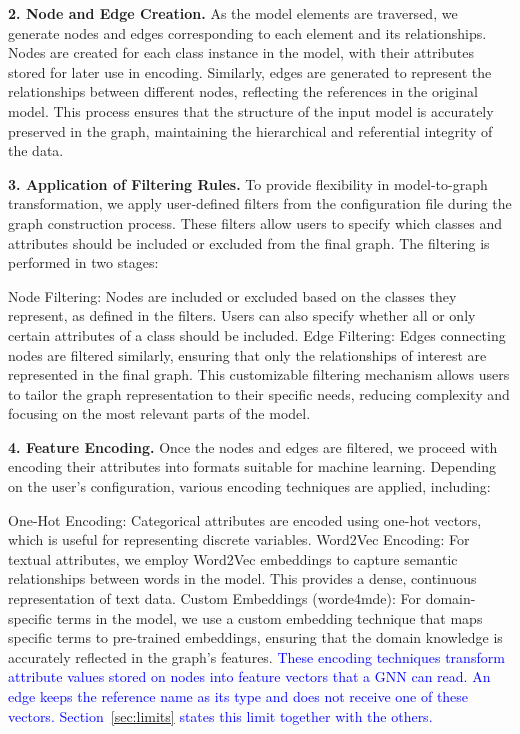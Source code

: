\documentclass[journal,article,submit,moreauthors,technologies]{Definitions/mdpi}
\newcommand{\rev}[1]{\textcolor{blue}{#1}}
\begin{document}
\textbf{2. Node and Edge Creation.}
As the model elements are traversed, we generate nodes and edges corresponding to each element and its relationships. Nodes are created for each class instance in the model, with their attributes stored for later use in encoding. Similarly, edges are generated to represent the relationships between different nodes, reflecting the references in the original model. This process ensures that the structure of the input model is accurately preserved in the graph, maintaining the hierarchical and referential integrity of the data.

\textbf{3. Application of Filtering Rules.}
To provide flexibility in model-to-graph transformation, we apply user-defined filters from the configuration file during the graph construction process. These filters allow users to specify which classes and attributes should be included or excluded from the final graph. The filtering is performed in two stages:

Node Filtering: Nodes are included or excluded based on the classes they represent, as defined in the filters. Users can also specify whether all or only certain attributes of a class should be included.
Edge Filtering: Edges connecting nodes are filtered similarly, ensuring that only the relationships of interest are represented in the final graph.
This customizable filtering mechanism allows users to tailor the graph representation to their specific needs, reducing complexity and focusing on the most relevant parts of the model.

\textbf{4. Feature Encoding.}
Once the nodes and edges are filtered, we proceed with encoding their attributes into formats suitable for machine learning. Depending on the user's configuration, various encoding techniques are applied, including:

One-Hot Encoding: Categorical attributes are encoded using one-hot vectors, which is useful for representing discrete variables.
Word2Vec Encoding: For textual attributes, we employ Word2Vec embeddings to capture semantic relationships between words in the model. This provides a dense, continuous representation of text data.
Custom Embeddings (worde4mde): For domain-specific terms in the model, we use a custom embedding technique that maps specific terms to pre-trained embeddings, ensuring that the domain knowledge is accurately reflected in the graph's features.
\rev{These encoding techniques transform attribute values stored on nodes into feature vectors that a GNN can read. An edge keeps the reference name as its type and does not receive one of these vectors. Section~\ref{sec:limits} states this limit together with the others.}
\end{document}
